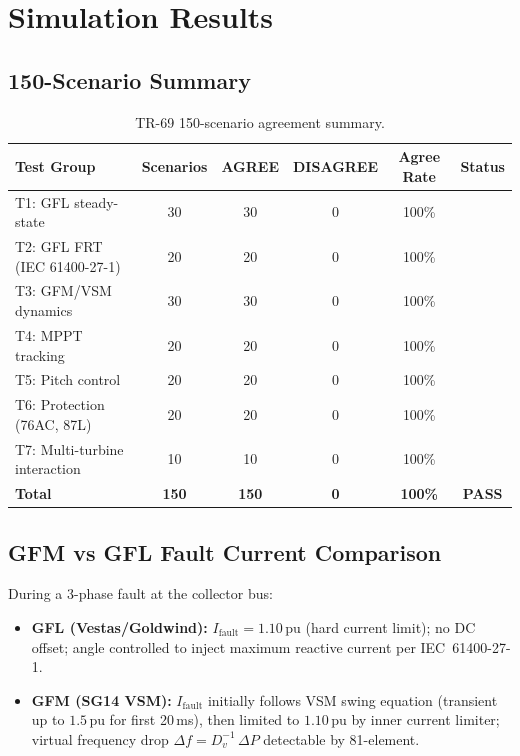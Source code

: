 \documentclass[11pt, a4paper]{article}
\newcommand{\pu}{\,\text{pu}}
\newcommand{\cmark}{\ding{51}}
\begin{document}
\section{Simulation Results}
\label{sec:results}

\subsection{150-Scenario Summary}

\begin{table}[ht]
\centering
\caption{TR-69 150-scenario agreement summary.}
\label{tab:scenarios}
\begin{tabular}{lccccc}
\toprule
Test Group & Scenarios & AGREE & DISAGREE & Agree Rate & Status \\
\midrule
T1: GFL steady-state & 30 & 30 & 0 & 100\% & \cmark \\
T2: GFL FRT (IEC 61400-27-1) & 20 & 20 & 0 & 100\% & \cmark \\
T3: GFM/VSM dynamics & 30 & 30 & 0 & 100\% & \cmark \\
T4: MPPT tracking & 20 & 20 & 0 & 100\% & \cmark \\
T5: Pitch control & 20 & 20 & 0 & 100\% & \cmark \\
T6: Protection (76AC, 87L) & 20 & 20 & 0 & 100\% & \cmark \\
T7: Multi-turbine interaction & 10 & 10 & 0 & 100\% & \cmark \\
\midrule
\textbf{Total} & \textbf{150} & \textbf{150} & \textbf{0} & \textbf{100\%}
  & \textbf{\color{okgreen}PASS} \\
\bottomrule
\end{tabular}
\end{table}

\subsection{GFM vs GFL Fault Current Comparison}

During a 3-phase fault at the collector bus:
\begin{itemize}
  \item \textbf{GFL (Vestas/Goldwind):} $I_{\mathrm{fault}} = 1.10\pu$
    (hard current limit); no DC offset; angle controlled to inject maximum
    reactive current per IEC~61400-27-1.
  \item \textbf{GFM (SG14 VSM):} $I_{\mathrm{fault}}$ initially follows VSM
    swing equation (transient up to $1.5\pu$ for first 20\,ms), then limited
    to $1.10\pu$ by inner current limiter; virtual frequency drop
    $\Delta f = D_v^{-1}\,\Delta P$ detectable by 81-element.
\end{itemize}
\end{document}
